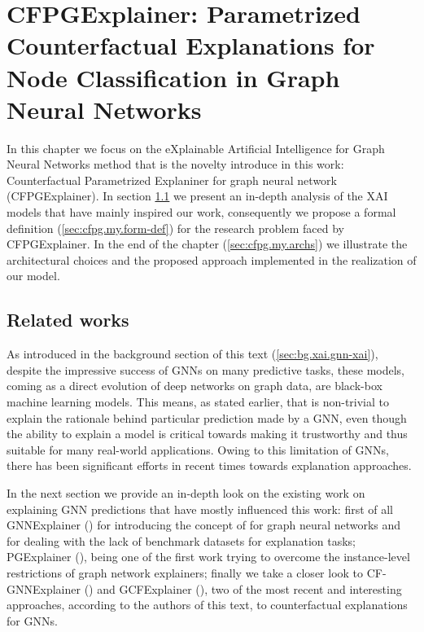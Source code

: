 \documentclass[binding=0.6cm]{sapthesis}
\newcommand{\mycite}[1]{(\cite{#1})}
\begin{document}
\chapter[CFPGExplainer]{CFPGExplainer: Parametrized Counterfactual Explanations for Node Classification in Graph Neural Networks}
\label{chap:3-CFPG}
In this chapter we focus on the eXplainable Artificial Intelligence for Graph Neural Networks method that is the novelty introduce in this work: Counterfactual Parametrized Explaniner for graph neural network (CFPGExplainer). In section \ref{sec:cfpg.bg} we present an in-depth analysis of the XAI models that have mainly inspired our work, consequently we propose a formal definition (\cref{sec:cfpg.my.form-def}) for the research problem faced by CFPGExplainer. In the end of the chapter (\cref{sec:cfpg.my.archs}) we illustrate the architectural choices and the proposed approach implemented in the realization of our model.

\section{Related works}
\label{sec:cfpg.bg}
As introduced in the background section of this text (\cref{sec:bg.xai.gnn-xai}), despite the impressive success of GNNs on many predictive tasks, these models, coming as a direct evolution of deep networks on graph data, are black-box machine learning models. This means, as stated earlier, that is non-trivial to explain the rationale behind particular prediction made by a GNN, even though the ability to explain a model is critical towards making it trustworthy and thus suitable for many real-world applications. Owing to this limitation of GNNs, there has been significant efforts in recent times towards explanation approaches. 

In the next section we provide an in-depth look on the existing work on explaining GNN predictions that have mostly influenced this work: first of all GNNExplainer \mycite{ying2019-gnnexplainer} for introducing the concept of  for graph neural networks and for dealing with the lack of benchmark datasets for explanation tasks; PGExplainer \mycite{luo2020-pgexplainer}, being one of the first work trying to overcome the instance-level restrictions of graph network explainers; finally we take a closer look to CF-GNNExplainer \mycite{lucic2022-cfgnnexplainer} and GCFExplainer \mycite{huang2023-globalCF}, two of the most recent and interesting approaches, according to the authors of this text, to counterfactual explanations for GNNs. 
\end{document}
